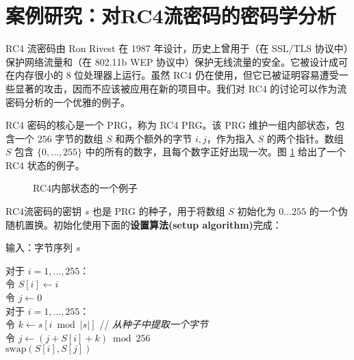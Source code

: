 \section{案例研究：对RC4流密码的密码学分析}

RC4 流密码由 Ron Rivest 在 1987 年设计，历史上曾用于（在 SSL/TLS 协议中）保护网络流量和（在 802.11b WEP 协议中）保护无线流量的安全。它被设计成可在内存很小的 $8$ 位处理器上运行。虽然 RC4 仍在使用，但它已被证明容易遭受一些显著的攻击，因而不应该被应用在新的项目中。我们对 RC4 的讨论可以作为流密码分析的一个优雅的例子。

RC4 密码的核心是一个 PRG，称为 RC4 PRG。该 PRG 维护一组内部状态，包含一个 $256$ 字节的数组 $S$ 和两个额外的字节 $i,j$，作为指入 $S$ 的两个指针。数组 $S$ 包含 $\{0,\dots,255\}$ 中的所有的数字，且每个数字正好出现一次。图 \ref{fig:3-12} 给出了一个 RC4 状态的例子。

\begin{figure}
	\centering
	
	\caption{RC4内部状态的一个例子}
	\label{fig:3-12}
\end{figure}

RC4流密码的密钥 $s$ 也是 PRG 的种子，用于将数组 $S$ 初始化为 $0 \dots 255$ 的一个伪随机置换。初始化使用下面的\textbf{设置算法(setup algorithm)}完成：

\vspace*{10pt}

\hspace*{5pt} 输入：字节序列 $s$

\vspace{5pt}

\hspace*{5pt} 对于 $i=1,\dots,255$：\\
\hspace*{50pt} 令 $S[i]\leftarrow i$ \\
\hspace*{26pt} 令 $j\leftarrow0$\\
\hspace*{26pt} 对于 $i=1,\dots,255$：\\
\hspace*{50pt} 令 $k\leftarrow s[i\bmod |s|]$ \quad\quad // \emph{从种子中提取一个字节}\\
\hspace*{50pt} 令 $j\leftarrow(j+S[i]+k)\bmod 256$\\
\hspace*{50pt} $\mathrm{swap}(S[i],S[j])$

\vspace*{10pt}

